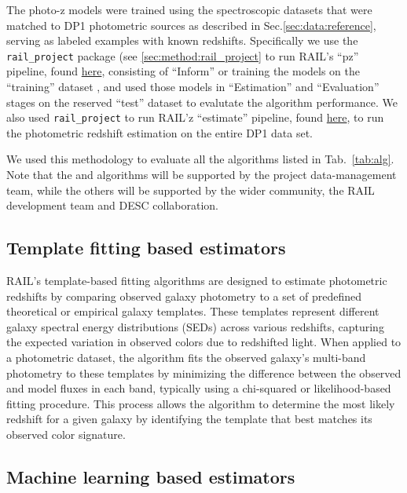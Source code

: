 The photo-z models were trained using the spectroscopic datasets that were matched to DP1 photometric sources as described in Sec.\ref{sec:data:reference}, serving as labeled examples with known redshifts.   Specifically we use the \texttt{rail\_project} package (see \ref{sec:method:rail_project} to run RAIL's ``pz'' pipeline, found \href{https://github.com/LSSTDESC/rail_pipelines/blob/main/src/rail/pipelines/estimation/pz_all.py}{here}, consisting of ``Inform'' or training the models on the ``training'' dataset , and used those models in ``Estimation'' and ``Evaluation'' stages on the reserved ``test'' dataset to evalutate the algorithm performance.  We also used \texttt{rail\_project}  to run RAIL'z ``estimate'' pipeline, found \href{https://github.com/LSSTDESC/rail_pipelines/blob/main/src/rail/pipelines/estimation/estimate_all.py}{here}, to run the photometric redshift estimation on the entire DP1 data set.

We used this methodology to evaluate all the algorithms listed in Tab.~\ref{tab:alg}.  Note that the  and  algorithms will be supported by the project data-management team, while the others will be supported by the wider community, the RAIL development team and DESC collaboration.


\subsection{Template fitting based estimators}
\label{sec:method:template}

RAIL’s template-based fitting algorithms are designed to estimate photometric redshifts by comparing observed galaxy photometry to a set of predefined theoretical or empirical galaxy templates.  These templates represent different galaxy spectral energy distributions (SEDs) across various redshifts, capturing the expected variation in observed colors due to redshifted light.  When applied to a photometric dataset, the algorithm fits the observed galaxy’s multi-band photometry to these templates by minimizing the difference between the observed and model fluxes in each band, typically using a chi-squared or likelihood-based fitting procedure.  This process allows the algorithm to determine the most likely redshift for a given galaxy by identifying the template that best matches its observed color signature.


\subsection{Machine learning based estimators}
\label{sec:method:machine_learning}



